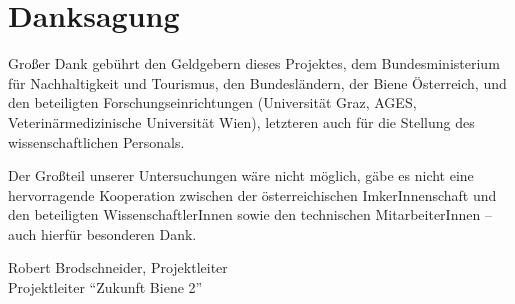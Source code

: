 {}
\section*{Danksagung}

Großer Dank gebührt den Geldgebern dieses Projektes, dem Bundesministerium für Nachhaltigkeit und Tourismus, den Bundesländern, der Biene Österreich, und den beteiligten Forschungseinrichtungen (Universität Graz, AGES, Veterinärmedizinische Universität Wien), letzteren auch für die Stellung des wissenschaftlichen Personals.

Der Großteil unserer Untersuchungen wäre nicht möglich, gäbe es nicht eine hervorragende Kooperation zwischen der österreichischen ImkerInnenschaft und den beteiligten WissenschaftlerInnen sowie den technischen MitarbeiterInnen – auch hierfür besonderen Dank.

\begin{flushright}
    Robert Brodschneider, Projektleiter \\
    Projektleiter \enquote{Zukunft Biene 2}
\end{flushright}